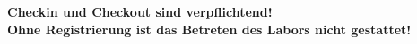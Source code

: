 \documentclass[24pt, a4paper, portrait]{article}
\begin{document}
\begin{figure}[!h]
    \centering
    \hfill
    \hfill
\end{figure}

\vspace{1cm}
\centering
\huge
\textbf{Checkin und Checkout sind verpflichtend! \\ Ohne Registrierung ist das Betreten des Labors nicht gestattet!}
\end{document}
